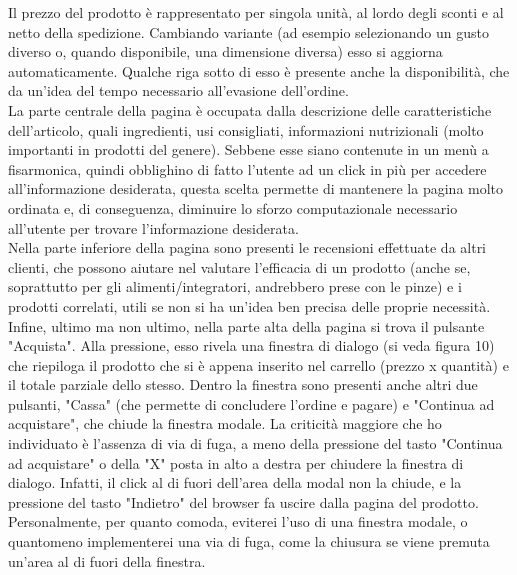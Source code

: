 Il prezzo del prodotto è rappresentato per singola unità, al lordo degli sconti e al netto della spedizione. Cambiando variante (ad esempio selezionando un gusto diverso o, quando disponibile, una dimensione diversa) esso si aggiorna automaticamente. Qualche riga sotto di esso è presente anche la disponibilità, che da un'idea del tempo necessario all'evasione dell'ordine.\\
La parte centrale della pagina è occupata dalla descrizione delle caratteristiche dell'articolo, quali ingredienti, usi consigliati, informazioni nutrizionali (molto importanti in prodotti del genere). Sebbene esse siano contenute in un menù a fisarmonica, quindi obblighino di fatto l'utente ad un click in più per accedere all'informazione desiderata, questa scelta permette di mantenere la pagina molto ordinata e, di conseguenza, diminuire lo sforzo computazionale necessario all'utente per trovare l'informazione desiderata.\\
Nella parte inferiore della pagina sono presenti le recensioni effettuate da altri clienti, che possono aiutare nel valutare l'efficacia di un prodotto (anche se, soprattutto per gli alimenti/integratori, andrebbero prese con le pinze) e i prodotti correlati, utili se non si ha un'idea ben precisa delle proprie necessità.\\
Infine, ultimo ma non ultimo, nella parte alta della pagina si trova il pulsante "Acquista". Alla pressione, esso rivela una finestra di dialogo (si veda figura 10) che riepiloga il prodotto che si è appena inserito nel carrello (prezzo x quantità) e il totale parziale dello stesso. Dentro la finestra sono presenti anche altri due pulsanti, "Cassa" (che permette di concludere l'ordine e pagare) e "Continua ad acquistare", che chiude la finestra modale. La criticità maggiore che ho individuato è l'assenza di via di fuga, a meno della pressione del tasto "Continua ad acquistare" o della "X" posta in alto a destra per chiudere la finestra di dialogo. Infatti, il click al di fuori dell'area della modal non la chiude, e la pressione del tasto "Indietro" del browser fa uscire dalla pagina del prodotto. Personalmente, per quanto comoda, eviterei l'uso di una finestra modale, o quantomeno implementerei una via di fuga, come la chiusura se viene premuta un'area al di fuori della finestra.
